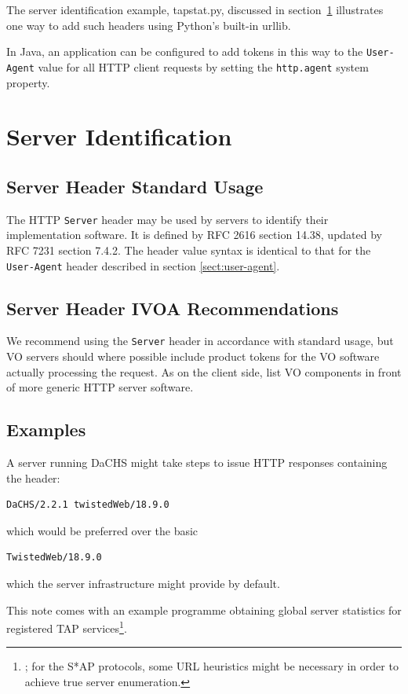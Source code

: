 \documentclass[11pt,a4paper]{ivoa}
\newcommand{\headername}[1]{{\tt #1}}
\begin{document}
The server identification example, tapstat.py, discussed in
section~\ref{sect:server} illustrates one way to add such headers using
Python's built-in urllib.

In Java, an application can be configured to add tokens in this way
to the \headername{User-Agent} value for all HTTP client requests
by setting the {\tt http.agent} system property.


\section{Server Identification}
\label{sect:server}

\subsection{Server Header Standard Usage}

The HTTP \headername{Server} header may be used by servers to
identify their implementation software.
It is defined by RFC 2616 section 14.38,
updated by RFC 7231 section 7.4.2.
The header value syntax is identical to that for the
\headername{User-Agent} header described in section \ref{sect:user-agent}.

\subsection{Server Header IVOA Recommendations}

We recommend using the \headername{Server} header
in accordance with standard usage,
but VO servers should where possible include product tokens
for the VO software actually processing the request.
As on the client side, list VO components in front of
more generic HTTP server software.

\subsection{Examples}

A server running DaCHS might take steps to issue HTTP responses
containing the header:
\begin{verbatim}
DaCHS/2.2.1 twistedWeb/18.9.0
\end{verbatim}
which would be preferred over the basic
\begin{verbatim}
TwistedWeb/18.9.0
\end{verbatim}
which the server infrastructure might provide by default.

This note comes with an example programme obtaining global server
statistics for registered TAP
services\footnote{; for the S*AP protocols,
some URL heuristics might be necessary in order to achieve true server
enumeration.}.
\end{document}
